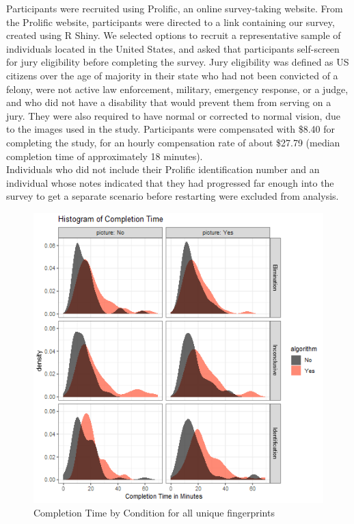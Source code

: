 \documentclass[print]{nuthesis}
\begin{document}
Participants were recruited using Prolific, an online survey-taking website.
From the Prolific website, participants were directed to a link containing our survey, created using R Shiny.
We selected options to recruit a representative sample of individuals located in the United States, and asked that participants self-screen for jury eligibility before completing the survey.
Jury eligibility was defined as US citizens over the age of majority in their state who had not been convicted of a felony, were not active law enforcement, military, emergency response, or a judge, and who did not have a disability that would prevent them from serving on a jury.
They were also required to have normal or corrected to normal vision, due to the images used in the study.
Participants were compensated with \$8.40 for completing the study, for an hourly compensation rate of about \$27.79 (median completion time of approximately 18 minutes).\\
Individuals who did not include their Prolific identification number and an individual whose notes indicated that they had progressed far enough into the survey to get a separate scenario before restarting were excluded from analysis.

\begin{figure}

{\centering \includegraphics[width=\linewidth]{images/completiontime} 

}

\caption{Completion Time by Condition for all unique fingerprints}\label{fig:completiontime}
\end{figure}
\end{document}
